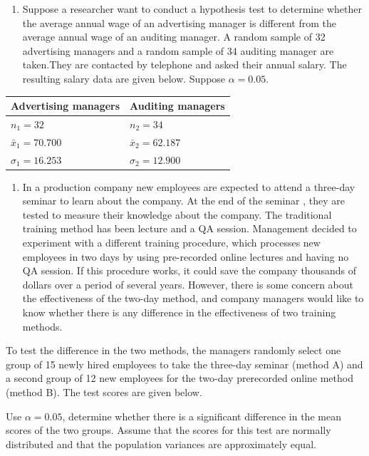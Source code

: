 \documentclass[]{book}
\providecommand{\tightlist}{%
  \setlength{\itemsep}{0pt}\setlength{\parskip}{0pt}}
\begin{document}
\begin{enumerate}
\def\labelenumi{\arabic{enumi}.}
\setcounter{enumi}{9}
\tightlist
\item
  Suppose a researcher want to conduct a hypothesis test to determine whether the average annual wage of an advertising manager is different from the average annual wage of an auditing manager. A random sample of 32 advertising managers and a random sample of 34 auditing manager are taken.They are contacted by telephone and asked their annual salary. The resulting salary data are given below. Suppose \(\alpha =0.05.\)
\end{enumerate}

\begin{longtable}[]{@{}ll@{}}
\toprule
Advertising managers & Auditing managers\tabularnewline
\midrule
\endhead
\(n_1 = 32\) & \(n_2 = 34\)\tabularnewline
\(\bar{x}_1 = 70.700\) & \(\bar{x}_2 = 62.187\)\tabularnewline
\(\sigma_1 = 16.253\) & \(\sigma_2 = 12.900\)\tabularnewline
\bottomrule
\end{longtable}

\begin{enumerate}
\def\labelenumi{\arabic{enumi}.}
\setcounter{enumi}{10}
\tightlist
\item
  In a production company new employees are expected to attend a three-day seminar to learn about the company. At the end of the seminar , they are tested to measure their knowledge about the company. The traditional training method has been lecture and a QA session. Management decided to experiment with a different training procedure, which processes new employees in two days by using pre-recorded online lectures and having no QA session. If this procedure works, it could save the company thousands of dollars over a period of several years. However, there is some concern about the effectiveness of the two-day method, and company managers would like to know whether there is any difference in the effectiveness of two training methods.
\end{enumerate}

To test the difference in the two methods, the managers randomly select one group of 15 newly hired employees to take the three-day seminar (method A) and a second group of 12 new employees for the two-day prerecorded online method (method B). The test scores are given below.

Use \(\alpha =0.05\), determine whether there is a significant difference in the mean scores of the two groups. Assume that the scores for this test are normally distributed and that the population variances are approximately equal.
\end{document}
